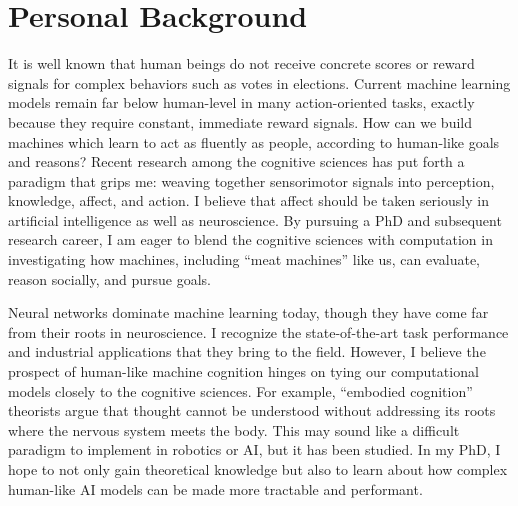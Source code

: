 \section*{Personal Background}

\begin{singlespace}
It is well known that human beings do not receive concrete scores
or reward signals for complex behaviors such as votes in elections.
Current machine learning models remain far below human-level in many
action-oriented tasks, exactly because they require constant, immediate
reward signals\cite{Lake2016}. How can we build machines which learn
to act as fluently as people, according to human-like goals and reasons\cite{Lake2016,Railton2017}?
Recent research among the cognitive sciences has put forth a paradigm
that grips me: weaving together sensorimotor signals into perception,
knowledge, affect, and action\cite{probmods,Clark2013}. I believe
that affect should be taken seriously in artificial intelligence as
well as neuroscience. By pursuing a PhD and subsequent research career,
I am eager to blend the cognitive sciences with computation in investigating
how machines, including ``meat machines'' like us, can evaluate,
reason socially, and pursue goals.
\end{singlespace}

\begin{singlespace}
\im
Neural networks dominate machine learning today, though they have
come far from their roots in neuroscience\cite{hassabis2017neuroscience}.
I recognize the state-of-the-art task performance and industrial applications
that they bring to the field. However, I believe the prospect of human-like
machine cognition hinges on tying our computational models closely
to the cognitive sciences\cite{Lake2016}. For example, \textquotedblleft embodied
cognition\textquotedblright{} theorists argue that thought cannot
be understood without addressing its roots where the nervous system
meets the body\cite{Clark2017}. This may sound like a difficult paradigm
to implement in robotics or AI, but it has been studied\cite{pio2016active}.
In my PhD, I hope to not only gain theoretical knowledge but also
to learn about how complex human-like AI models can be made more tractable
and performant\cite{kwisthout2013predictive,Jonas2014}.
\end{singlespace}

